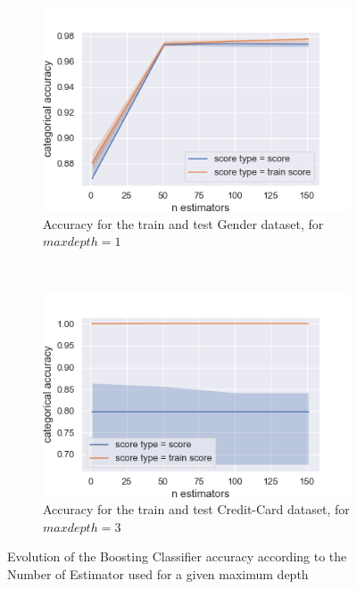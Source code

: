 \documentclass[10pt]{article}
\begin{document}
		\paragraph*{}
			\begin{figure}[h]
				\centering
				\begin{subfigure}[]{0.45\columnwidth}
					\centering
					\includegraphics[width=\linewidth]{../graphics/boost_gender_n_estimators_score_type_score_type.png}
					\caption{Accuracy for the train and test Gender dataset, for $maxdepth=1$}
					\label{boost:g_train_vs_test_es}
				\end{subfigure}
				~
				\begin{subfigure}[]{0.45\columnwidth}
					\centering
					\includegraphics[width=\linewidth]{../graphics/boost_creditcard_n_estimators_score_type_score_type.png}
					\caption{Accuracy for the train and test Credit-Card dataset, for $maxdepth=3$}
					\label{boost:cc_train_vs_test_es}
				\end{subfigure}
				\caption{Evolution of the Boosting Classifier accuracy according to the Number of Estimator used for a given maximum depth}
				\label{boost:train_vs_test_es}
			\end{figure}
\end{document}
